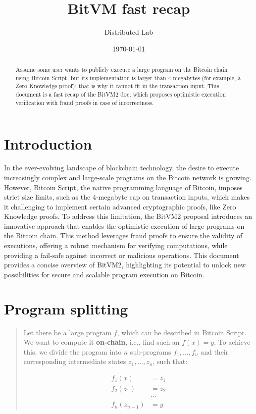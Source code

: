 \documentclass[11pt]{article}
\author{Distributed Lab}
\date{\today}
\title{BitVM fast recap}
\begin{document}
\maketitle

\begin{abstract}
  Assume some user wants to publicly execute a large program on the
  Bitcoin chain using Bitcoin Script, but its implementation is larger
  than 4 megabytes (for example, a Zero Knowledge proof); that is why it
  cannot fit in the transaction input. This document is a fast recap of
  the BitVM2 doc, which proposes optimistic execution verification with
  fraud proofs in case of incorrectness.
\end{abstract}

\setcounter{tocdepth}{2}
\tableofcontents

\section{Introduction}\label{sec:intro}

In the ever-evolving landscape of blockchain technology, the desire to
execute increasingly complex and large-scale programs on the
Bitcoin\autocite{bitcoin_paper} network is growing. However, Bitcoin
Script, the native programming language of Bitcoin, imposes strict
size limits, such as the 4-megabyte cap on transaction inputs, which
makes it challenging to implement certain advanced cryptographic
proofs, like Zero Knowledge proofs. To address this limitation, the
BitVM2\autocite{bitvm2} proposal introduces an innovative approach
that enables the optimistic execution of large programs on the Bitcoin
chain. This method leverages fraud proofs to ensure the validity of
executions, offering a robust mechanism for verifying computations,
while providing a fail-safe against incorrect or malicious
operations. This document provides a concise overview of BitVM2,
highlighting its potential to unlock new possibilities for secure and
scalable program execution on Bitcoin.

\section{Program splitting}\label{sec:program-splitting}

\begin{quote}
  Let there be a large program \(f\), which can be described in Bitcoin
  Script. We want to compute it \textbf{\textbf{on-chain}}, i.e., find
  such an \(f(x) = y\). To achieve this, we divide the program into
  \(n\) sub-programs \(f_1, \ldots, f_n\) and their corresponding
  intermediate states \(z_1, \ldots, z_n\), such that:

  \begin{equation}
    \begin{aligned}
      f_1(x) &= z_1 \\
      f_2(z_1) &= z_2 \\
      &\cdots \\
      f_n(z_{n-1}) &= y
    \end{aligned}
  \end{equation}
\end{quote}
\end{document}
